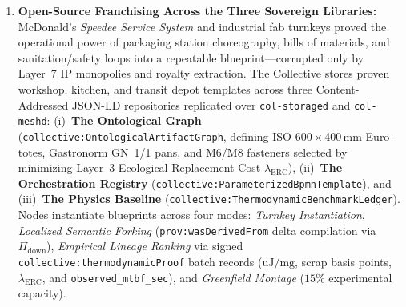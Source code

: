 \begin{enumerate}
    \item \textbf{Open-Source Franchising Across the Three Sovereign Libraries:}
    McDonald's \emph{Speedee Service System} and industrial fab turnkeys proved the operational power
    of packaging station choreography, bills of materials, and sanitation/safety loops into a
    repeatable blueprint---corrupted only by Layer~7 IP monopolies and royalty extraction. The
    Collective stores proven workshop, kitchen, and transit depot templates across three
    Content-Addressed JSON-LD repositories replicated over \texttt{col-storaged} and \texttt{col-meshd}:
    (i)~\textbf{The Ontological Graph} (\texttt{collective:OntologicalArtifactGraph}, defining ISO
    $600 \times 400\,\mathrm{mm}$ Euro-totes, Gastronorm GN~1/1 pans, and M6/M8 fasteners selected by
    minimizing Layer~3 Ecological Replacement Cost $\lambda_{\mathrm{ERC}}$), (ii)~\textbf{The
    Orchestration Registry} (\texttt{collective:ParameterizedBpmnTemplate}), and (iii)~\textbf{The
    Physics Baseline} (\texttt{collective:ThermodynamicBenchmarkLedger}). Nodes instantiate blueprints
    across four modes: \emph{Turnkey Instantiation}, \emph{Localized Semantic Forking}
    (\texttt{prov:wasDerivedFrom} delta compilation via $\Pi_{\mathrm{down}}$), \emph{Empirical Lineage
    Ranking} via signed \texttt{collective:thermodynamicProof} batch records ($\mathrm{uJ/mg}$, scrap
    basis points, $\lambda_{\mathrm{ERC}}$, and \texttt{observed\_mtbf\_sec}), and \emph{Greenfield
    Montage} ($15\%$ experimental capacity).


\end{enumerate}
